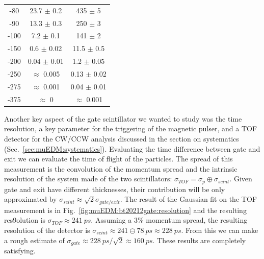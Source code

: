 \begin{refsection}
\begin{table}[ht]
\begin{minipage}{0.4\textwidth}
\begin{tabular}{|c|c|c|}
                -80 & 23.7 $\pm$ 0.2 & 435 $\pm$ 5 \\
                -90 & 13.3 $\pm$ 0.3 & 250 $\pm$ 3 \\
                -100 & 7.2 $\pm$ 0.1 & 141 $\pm$ 2 \\
                -150 & 0.6 $\pm$ 0.02 & 11.5 $\pm$ 0.5 \\
                -200 & 0.04 $\pm$ 0.01 & 1.2 $\pm$ 0.05 \\
                -250 & $\approx$ 0.005 & 0.13 $\pm$ 0.02 \\
                -275 & $\approx$ 0.001 & 0.04 $\pm$ 0.01 \\
                -375 & $\approx$ 0 & $\approx$ 0.001 \\
                \hline
                \end{tabular}
                \label{tab:muEDM:bt2022:gatenoise}
              \end{minipage}
            \end{table}

            \noindent
            Another key aspect of the gate scintillator we wanted to study was the time resolution, a key parameter for the triggering of the magnetic pulser, and a TOF detector for the CW/CCW analysis discussed in the section on systematics (Sec.~\ref{sec:muEDM:systematics}).
            Evaluating the time difference between gate and exit we can evaluate the time of flight of the particles. 
            The spread of this measurement is the convolution of the momentum spread and the intrinsic resolution of the system made of the two scintillators: $\sigma_{TOF} = \sigma_{p} \oplus \sigma_{scint}$.
            Given gate and exit have different thicknesses, their contribution will be only approximated by $\sigma_{scint}\approx\sqrt{2}\sigma_{gate/exit}$.
            The result of the Gaussian fit on the TOF measurement is in Fig.~\ref{fig:muEDM:bt20212gate:resolution} and the resulting res9olution is $\sigma_{TOF} \approx \SI{241}{ps}$.
            Assuming a 3\% momentum spread, the resulting resolution of the detector is $\sigma_{scint}\approx 241 \ominus \SI{78}{ps} \approx \SI{228}{ps}$.
            From this we can make a rough estimate of $\sigma_{gate}\approx\SI{228}{ps}/\sqrt{2} \approx\SI{160}{ps}$.
            These results are completely satisfying.


\end{refsection}
